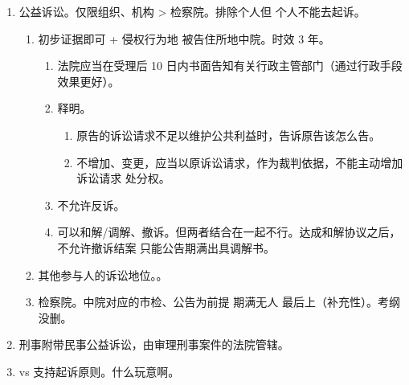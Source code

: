 \begin{enumerate}
\begin{enumerate}
\begin{kk}{小额程序的再审}
\begin{enumerate}
\begin{enumerate}
                            \item 以不应按照小额诉讼的程序审理为由 \yjt 可以上诉，不再适用一审终审的规定。
                          \end{enumerate}
                  \end{enumerate}
                \end{kk}
        \end{enumerate}
  \item 公益诉讼。仅限组织、机构 > 检察院。排除个人但 \bdy 个人不能去起诉。
        \begin{enumerate}
          \item 初步证据即可 + 侵权行为地 \hz 被告住所地中院。时效 3 年。
                \begin{enumerate}
                  \item 法院应当在受理后 10 日内书面告知有关行政主管部门（通过行政手段效果更好）。
                  \item 释明。
                        \begin{enumerate}
                          \item 原告的诉讼请求不足以维护公共利益时，告诉原告该怎么告。
                          \item 不增加、变更，应当以原诉讼请求，作为裁判依据，不能主动增加诉讼请求 \yjt 处分权。
                        \end{enumerate}
                  \item 不允许反诉。
                  \item 可以和解/调解、撤诉。但两者结合在一起不行。达成和解协议之后，不允许撤诉结案 \yjt 只能公告期满出具调解书。
                \end{enumerate}
          \item 其他参与人的诉讼地位。。
          \item 检察院。中院对应的市检、公告为前提 \yjt 期满无人 \yjt 最后上（补充性）。考纲没删。
        \end{enumerate}
  \item 刑事附带民事公益诉讼，由审理刑事案件的法院管辖。
  \item vs 支持起诉原则。什么玩意啊。
\end{enumerate}
